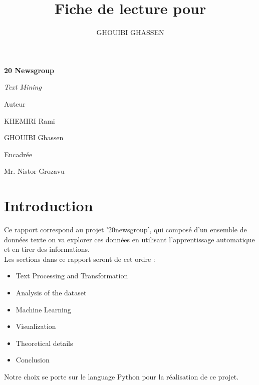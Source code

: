 \documentclass[english,a4paper,11pt,oneside]{article}
\author{\color{blue} \raggedright GHOUIBI GHASSEN}
\title{\color{red} \normalfont\huge Fiche de lecture pour }
\begin{document}
	 \begin{titlepage}
		\centering 
		\vspace{1cm}
		
		\vspace{0.5cm}
		{\huge\bfseries 20 Newsgroup \par}
		\vspace{0.5cm}
		\vfill
		{\Large\itshape Text Mining  \par}
		\vfill
		{\large Auteur  \par
			KHEMIRI Rami \par
			GHOUIBI Ghassen\textsc{}\par}
		\vspace{1cm}
		{\large Encadrée \par
			Mr. Nistor Grozavu \textsc{}\par
			
		}
	\end{titlepage}
	\tableofcontents
	\newpage
	\section{Introduction}{
		Ce rapport correspond au projet '20newsgroup', qui composé d'un ensemble de données texte on va explorer ces données en utilisant l'apprentissage automatique et en tirer des informations.\\
		Les sections dans ce rapport seront de cet ordre :
		\begin{itemize}
			\item Text Processing and Transformation
			\item Analysis of the dataset
			\item Machine Learning
			\item Visualization
			\item Theoretical details
			\item Conclusion
		\end{itemize}
		Notre choix se porte sur le language Python pour la réalisation de ce projet.
		
	}
	
\end{document}

